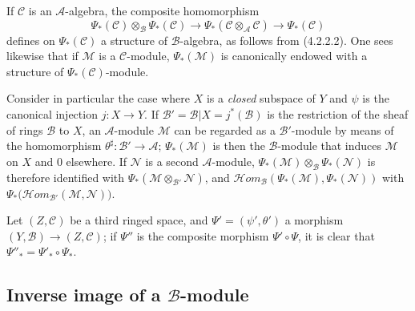 \begin{env}[4.2.4]
\label{0.4.2.4}
If $\mathcal{C}$ is an $\mathcal{A}$-algebra, the composite homomorphism
\[
  \Psi_*(\mathcal{C})\otimes_{\mathcal{B}}\Psi_*(\mathcal{C})
  \longrightarrow
  \Psi_*(\mathcal{C}\otimes_{\mathcal{A}}\mathcal{C})
  \longrightarrow
  \Psi_*(\mathcal{C})
\]
defines on $\Psi_*(\mathcal{C})$ a structure of $\mathcal{B}$-algebra,
as follows from (4.2.2.2). One sees likewise that if $\mathcal{M}$ is a
$\mathcal{C}$-module, $\Psi_*(\mathcal{M})$ is canonically endowed with a
structure of $\Psi_*(\mathcal{C})$-module.
\end{env}

\begin{env}[4.2.5]
\label{0.4.2.5}
Consider in particular the case where $X$ is a \emph{closed} subspace of
$Y$ and $\psi$ is the canonical injection $j:X\to Y$. If
$\mathcal{B}'=\mathcal{B}|X=j^*(\mathcal{B})$ is the restriction of the sheaf
of rings $\mathcal{B}$ to $X$, an $\mathcal{A}$-module $\mathcal{M}$ can
be regarded as a $\mathcal{B}'$-module by means of the homomorphism
$\theta^\sharp:\mathcal{B}'\to\mathcal{A}$; $\Psi_*(\mathcal{M})$ is then
the $\mathcal{B}$-module that induces $\mathcal{M}$ on $X$ and $0$ elsewhere. If
$\mathcal{N}$ is a second $\mathcal{A}$-module,
$\Psi_*(\mathcal{M})\otimes_{\mathcal{B}}\Psi_*(\mathcal{N})$ is therefore identified
with $\Psi_*(\mathcal{M}\otimes_{\mathcal{B}'}\mathcal{N})$, and
$\mathcal{H}\!om_{\mathcal{B}}(\Psi_*(\mathcal{M}),\Psi_*(\mathcal{N}))$
with
$\Psi_*\bigl(\mathcal{H}\!om_{\mathcal{B}'}(\mathcal{M},\mathcal{N})\bigr)$.
\end{env}

\begin{env}[4.2.6]
\label{0.4.2.6}
Let $(Z,\mathcal{C})$ be a third ringed space, and
$\Psi'=(\psi',\theta')$ a morphism
$(Y,\mathcal{B})\to(Z,\mathcal{C})$; if $\Psi''$ is the composite morphism
$\Psi'\circ\Psi$, it is clear that
$\Psi''_*=\Psi'_*\circ\Psi_*$.
\end{env}

\subsection{Inverse image of a $\mathcal{B}$-module}
\label{subsection:0.4.3}

